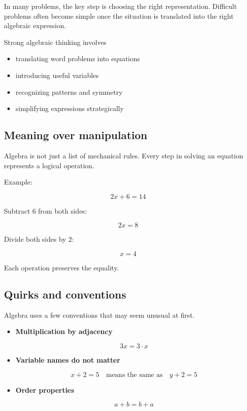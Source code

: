 \documentclass[11pt]{article}
\begin{document}
\begin{bluebox}
In many problems, the key step is choosing the right representation. Difficult problems often become simple once the situation is translated into the right algebraic expression.

Strong algebraic thinking involves

\begin{itemize}
\item translating word problems into equations
\item introducing useful variables
\item recognizing patterns and symmetry
\item simplifying expressions strategically
\end{itemize}

\subsection*{Meaning over manipulation}

Algebra is not just a list of mechanical rules. Every step in solving an equation represents a logical operation.

Example:

\[
2x+6=14
\]

Subtract $6$ from both sides:

\[
2x=8
\]

Divide both sides by $2$:

\[
x=4
\]

Each operation preserves the equality.

\subsection*{Quirks and conventions}

Algebra uses a few conventions that may seem unusual at first.

\begin{itemize}

\item \textbf{Multiplication by adjacency}

\[
3x = 3\cdot x
\]

\item \textbf{Variable names do not matter}

\[
x+2=5 \quad \text{means the same as} \quad y+2=5
\]

\item \textbf{Order properties}

\[
a+b=b+a
\]


\end{itemize}
\end{bluebox}
\end{document}
